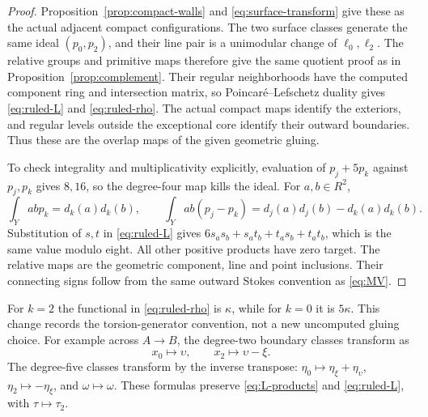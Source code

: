 \begin{proof}
Proposition~\ref{prop:compact-walls} and
\eqref{eq:surface-transform} give these as the actual
adjacent compact configurations. The two surface classes
generate the same ideal $(p_0,p_2)$, and their line pair
is a unimodular change of $\ell_0,\ell_2$.
The relative groups and primitive maps therefore give
the same quotient proof as in
Proposition~\ref{prop:complement}. Their regular
neighborhoods have the computed component ring and
intersection matrix, so Poincar\'e--Lefschetz duality
gives \eqref{eq:ruled-L} and \eqref{eq:ruled-rho}.
The actual compact maps identify the exteriors, and
regular levels outside the exceptional core identify
their outward boundaries. Thus these are the overlap
maps of the given geometric gluing.

To check integrality and multiplicativity explicitly,
evaluation of $p_j+5p_k$ against $p_j,p_k$ gives $8,16$,
so the degree-four map kills the ideal. For $a,b\in R^2$,
\[
 \int_Yabp_k=d_k(a)d_k(b),\qquad
 \int_Yab(p_j-p_k)=d_j(a)d_j(b)-d_k(a)d_k(b).
\]
Substitution of $s,t$ in \eqref{eq:ruled-L} gives
$6s_as_b+s_at_b+t_as_b+t_at_b$, which is the same
value modulo eight. All other positive products have
zero target. The relative maps are the geometric
component, line and point inclusions. Their connecting
signs follow from the same outward Stokes convention as
\eqref{eq:MV}.
\end{proof}

For $k=2$ the functional in \eqref{eq:ruled-rho} is
$\kappa$, while for $k=0$ it is $5\kappa$. This change
records the torsion-generator convention, not a new
uncomputed gluing choice. For example across $A\to B$,
the degree-two boundary classes transform as
\[
 x_0\longmapsto\upsilon,\qquad
 x_2\longmapsto\upsilon-\xi.
\]
The degree-five classes transform by the inverse transpose:
$\eta_0\mapsto \eta_\xi+\eta_\upsilon$, $\eta_2\mapsto-\eta_\xi$,
and $\omega\mapsto\omega$. These formulas preserve
\eqref{eq:L-products} and \eqref{eq:ruled-L}, with
$\tau\mapsto\tau_2$.

